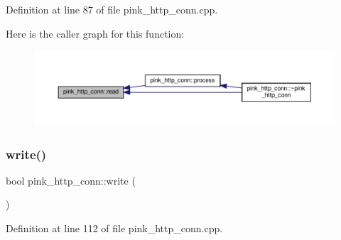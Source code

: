 Definition at line 87 of file pink\+\_\+http\+\_\+conn.\+cpp.

Here is the caller graph for this function\+:\nopagebreak
\begin{figure}[H]
\begin{center}
\leavevmode
\includegraphics[width=350pt]{classpink__http__conn_a254c09e8b962e5a0bc116f8da271b5ed_icgraph}
\end{center}
\end{figure}
\mbox{\label{classpink__http__conn_a362df085394bbf2818c8af93932c80d5}} 
\subsubsection{\texorpdfstring{write()}{write()}}
{\footnotesize\ttfamily bool pink\+\_\+http\+\_\+conn\+::write (\begin{DoxyParamCaption}{ }\end{DoxyParamCaption})}



Definition at line 112 of file pink\+\_\+http\+\_\+conn.\+cpp.

